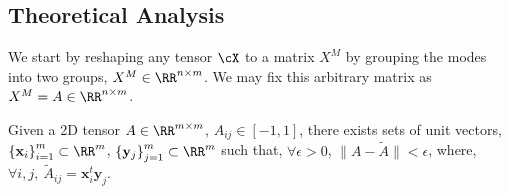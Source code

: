 \subsection{Theoretical Analysis}
We start by reshaping any tensor $\cX$ to a matrix $X^M$ by grouping the modes into two groups, $X^M \in \RR^{n \times m}$. We may fix this arbitrary matrix as $X^M = A \in \RR^{n \times m}$.

\begin{proposition}
\label{theory:prop1}
Given a 2D tensor $A\in \RR^{m\times m}$, $A_{ij} \in [-1,1]$, there exists sets of unit vectors, $\left\{\mathbf{x}_i\right\}_{i=1}^m\subset \RR^m$, $\left\{\mathbf{y}_j\right\}_{j=1}^m\subset \RR^m$ such that, $\forall \epsilon > 0$, $\|A - \widetilde{A}\| < \epsilon$, where, $\forall i,j,\: \widetilde{A}_{ij}=\mathbf{x}_i^t\mathbf{y}_j$.
\end{proposition}
